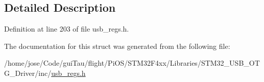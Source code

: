 \subsection{Detailed Description}


Definition at line 203 of file usb\-\_\-regs.\-h.



The documentation for this struct was generated from the following file\-:\begin{DoxyCompactItemize}
\item 
/home/jose/\-Code/gui\-Tau/flight/\-Pi\-O\-S/\-S\-T\-M32\-F4xx/\-Libraries/\-S\-T\-M32\-\_\-\-U\-S\-B\-\_\-\-O\-T\-G\-\_\-\-Driver/inc/\hyperlink{_s_t_m32_f4xx_2_libraries_2_s_t_m32___u_s_b___o_t_g___driver_2inc_2usb__regs_8h}{usb\-\_\-regs.\-h}\end{DoxyCompactItemize}
